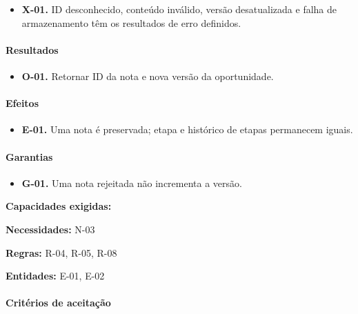 \documentclass[10pt,a4paper]{article}
\begin{document}
\begin{itemize}

\item \textbf{X-01.} ID desconhecido, conteúdo inválido, versão desatualizada e falha de armazenamento têm os resultados de erro definidos.

\end{itemize}

\paragraph{Resultados}

\begin{itemize}

\item \textbf{O-01.} Retornar ID da nota e nova versão da oportunidade.

\end{itemize}

\paragraph{Efeitos}

\begin{itemize}

\item \textbf{E-01.} Uma nota é preservada; etapa e histórico de etapas permanecem iguais.

\end{itemize}

\paragraph{Garantias}

\begin{itemize}

\item \textbf{G-01.} Uma nota rejeitada não incrementa a versão.

\end{itemize}

\textbf{Capacidades exigidas:}

\textbf{Necessidades:} N-03

\textbf{Regras:} R-04, R-05, R-08

\textbf{Entidades:} E-01, E-02

\paragraph{Critérios de aceitação}
\end{document}
